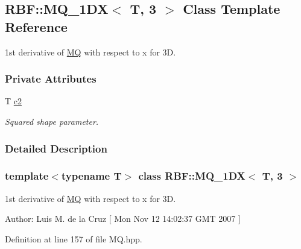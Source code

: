 \hypertarget{classRBF_1_1MQ__1DX_3_01T_00_013_01_4}{
\subsection{RBF::MQ\_\-1DX$<$ T, 3 $>$ Class Template Reference}
\label{classRBF_1_1MQ__1DX_3_01T_00_013_01_4}
}
1st derivative of \hyperlink{classRBF_1_1MQ}{MQ} with respect to x for 3D.  


\subsubsection*{Private Attributes}
\begin{CompactItemize}
\item 
\hypertarget{classRBF_1_1MQ__1DX_3_01T_00_013_01_4_6b75f02913bca7f604676062b04e1e97}{
T \hyperlink{classRBF_1_1MQ__1DX_3_01T_00_013_01_4_6b75f02913bca7f604676062b04e1e97}{c2}}
\label{classRBF_1_1MQ__1DX_3_01T_00_013_01_4_6b75f02913bca7f604676062b04e1e97}

\begin{CompactList}\small\item\em Squared shape parameter. \item\end{CompactList}\end{CompactItemize}


\subsubsection{Detailed Description}
\subsubsection*{template$<$typename T$>$ class RBF::MQ\_\-1DX$<$ T, 3 $>$}

1st derivative of \hyperlink{classRBF_1_1MQ}{MQ} with respect to x for 3D. 

\begin{Desc}
\item[Author:]Luis M. de la Cruz \mbox{[} Mon Nov 12 14:02:37 GMT 2007 \mbox{]} \end{Desc}


Definition at line 157 of file MQ.hpp.